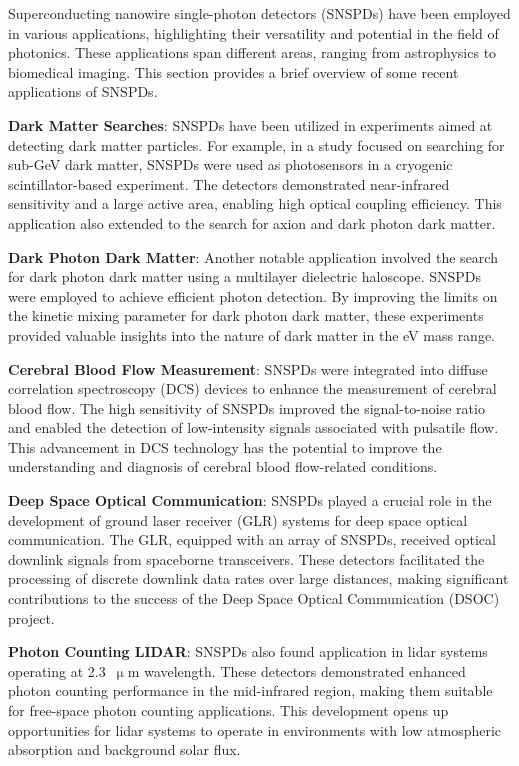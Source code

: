 \documentclass[11pt]{caltech_thesis} %
\begin{document}
Superconducting nanowire single-photon detectors (SNSPDs) have been employed in various applications, highlighting their versatility and potential in the field of photonics. These applications span different areas, ranging from astrophysics to biomedical imaging. This section provides a brief overview of some recent applications of SNSPDs.

\textbf{Dark Matter Searches}: SNSPDs have been utilized in experiments aimed at detecting dark matter particles. For example, in a study focused on searching for sub-GeV dark matter, SNSPDs were used as photosensors in a cryogenic scintillator-based experiment. The detectors demonstrated near-infrared sensitivity and a large active area, enabling high optical coupling efficiency. This application also extended to the search for axion and dark photon dark matter.

\textbf{Dark Photon Dark Matter}: Another notable application involved the search for dark photon dark matter using a multilayer dielectric haloscope. SNSPDs were employed to achieve efficient photon detection. By improving the limits on the kinetic mixing parameter for dark photon dark matter, these experiments provided valuable insights into the nature of dark matter in the eV mass range.

\textbf{Cerebral Blood Flow Measurement}: SNSPDs were integrated into diffuse correlation spectroscopy (DCS) devices to enhance the measurement of cerebral blood flow. The high sensitivity of SNSPDs improved the signal-to-noise ratio and enabled the detection of low-intensity signals associated with pulsatile flow. This advancement in DCS technology has the potential to improve the understanding and diagnosis of cerebral blood flow-related conditions.

\textbf{Deep Space Optical Communication}: SNSPDs played a crucial role in the development of ground laser receiver (GLR) systems for deep space optical communication. The GLR, equipped with an array of SNSPDs, received optical downlink signals from spaceborne transceivers. These detectors facilitated the processing of discrete downlink data rates over large distances, making significant contributions to the success of the Deep Space Optical Communication (DSOC) project.

\textbf{Photon Counting LIDAR}: SNSPDs also found application in lidar systems operating at 2.3~$\upmu \mathrm{m}$ wavelength. These detectors demonstrated enhanced photon counting performance in the mid-infrared region, making them suitable for free-space photon counting applications. This development opens up opportunities for lidar systems to operate in environments with low atmospheric absorption and background solar flux.
\end{document}
